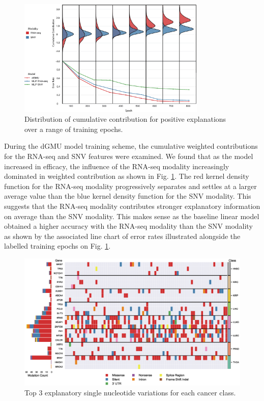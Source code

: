 \begin{figure}[h!]
        \centering
        \includegraphics[width=0.8\textwidth]{img/weightdisth6.eps}
         
        \caption{Distribution of cumulative contribution for positive explanations over a range of training epochs.}
        \label{fig:weightdist_error}
\end{figure}

During the dGMU model training scheme, the cumulative weighted contributions for the RNA-seq and SNV features were examined. We found that as the model increased in efficacy, the influence of the RNA-seq modality increasingly dominated in weighted contribution as shown in Fig. \ref{fig:weightdist_error}. The red kernel density function for the RNA-seq modality progressively separates and settles at a larger average value than the blue kernel density function for the SNV modality. This suggests that the RNA-seq modality contributes stronger explanatory information on average than the SNV modality. This makes sense as the baseline linear model obtained a higher accuracy with the RNA-seq modality than the SNV modality as shown by the associated line chart of error rates illustrated alongside the labelled training epochs on Fig. \ref{fig:weightdist_error}. 
\begin{figure}[h!]
    \centering
    \includegraphics[width=\textwidth]{img/oncoplot.eps}
    \caption{Top 3 explanatory single nucleotide variations for each cancer class.}
    \label{fig:oncoplot}
\end{figure}

